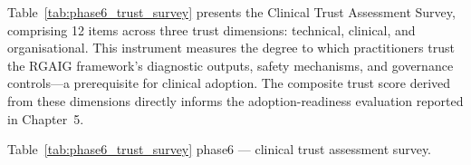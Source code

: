\vspace{1.5em}

Table~\ref{tab:phase6_trust_survey} presents the Clinical Trust Assessment Survey, comprising 12 items across three trust dimensions: technical, clinical, and organisational. This instrument measures the degree to which practitioners trust the RGAIG framework's diagnostic outputs, safety mechanisms, and governance controls---a prerequisite for clinical adoption. The composite trust score derived from these dimensions directly informs the adoption-readiness evaluation reported in Chapter~5.

\begingroup\singlespacing\tablefontsize\tablestripes
\noindent Table~\ref{tab:phase6_trust_survey} phase6 --- clinical trust assessment survey.

